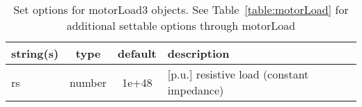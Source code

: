 \begin{table}[ht]
\centering
\begin{tabular}{p{5cm} c c p{7cm}}
\hline
string(s) & type & default & description \\
\hline
rs & number & 1e+48 & [p.u.] resistive load (constant impedance)\\
\hline
\end{tabular}
\caption{Set options for motorLoad3 objects. See Table~\ref{table:motorLoad} for additional settable options through motorLoad}
\label{table:motorLoad3}
\end{table}
